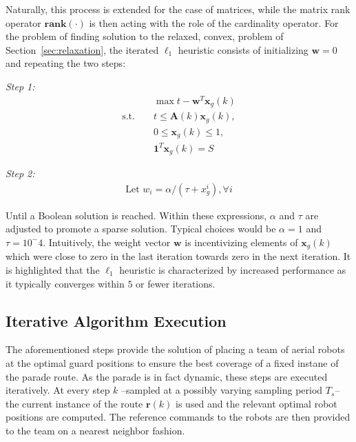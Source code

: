 \documentclass[letterpaper, 10 pt, conference]{ieeeconf}  %
\begin{document}
Naturally, this process is extended for the case of matrices, while the matrix rank operator $\mathbf{rank}(\cdot)$ is then acting with the role of the cardinality operator. For the problem of finding solution to the relaxed, convex, problem of Section~\ref{sec:relaxation}, the iterated $\ell_1$ heuristic consists of initializing $\mathbf{w} = 0$ and repeating the two steps:

\noindent \emph{Step 1:}
\begin{eqnarray}
  &&\max t-\mathbf{w}^T \mathbf{x}_g(k) \\ \nonumber 
  \textrm{s.t.~} && t\le \mathbf{A}(k)\mathbf{x}_g(k),\\ \nonumber && 0\le\mathbf{x}_g(k)\le 1, \\ \nonumber && \mathbf{1}^T\mathbf{x}_g(k)=S
\end{eqnarray}

\noindent \emph{Step 2:}
\begin{eqnarray}
 \textrm{Let~} w_i = \alpha/(\tau + x_g^i),\forall i
\end{eqnarray}

\noindent Until a Boolean solution is reached. Within these expressions, $\alpha$ and $\tau$ are adjusted to promote a sparse solution. Typical choices would be $\alpha =1$ and $\tau=10^-4$.  Intuitively, the weight vector $\mathbf{w}$ is incentivizing elements of $\mathbf{x}_g(k)$ which were close to zero in the last iteration towards zero in the next iteration. It is highlighted that the $\ell_1$ heuristic is characterized by increased performance as it typically converges within $5$ or fewer iterations. 

\subsection{Iterative Algorithm Execution}

The aforementioned steps provide the solution of placing a team of aerial robots at the optimal guard positions to ensure the best coverage of a fixed instane of the parade route. As the parade is in fact dynamic, these steps are executed iteratively. At every step $k$ --sampled at a possibly varying sampling period $T_s$-- the current instance of the route $\mathbf{r}(k)$ is used and the relevant optimal robot positions are computed. The reference commands to the robots are then provided to the team on a nearest neighbor fashion.

\end{document}
